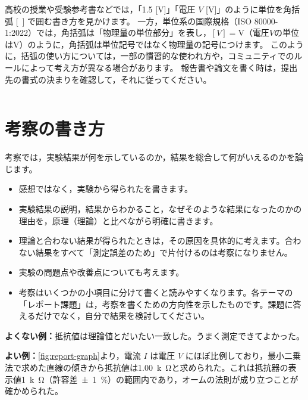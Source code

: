 \begin{column}
  高校の授業や受験参考書などでは，「1.5 [V]」「電圧 $V$ [V]」のように単位を角括弧 [~] で囲む書き方を見かけます。
  一方，単位系の国際規格（ISO 80000-1:2022）では，角括弧は「物理量の単位部分」を表し，$[V]=\mathrm{V}$（電圧$V$の単位は$\mathrm{V}$）のように，角括弧は単位記号ではなく物理量の記号につけます。
  このように，括弧の使い方については，一部の慣習的な使われ方や，コミュニティでのルールによって考え方が異なる場合があります。
  報告書や論文を書く時は，提出先の書式の決まりを確認して，それに従ってください。
\end{column}

\section{考察の書き方}

考察では，実験結果が何を示しているのか，結果を総合して何がいえるのかを論じます。
\begin{itemize}
  \item 感想ではなく，実験から得られたを書きます。
  \item 実験結果の説明，結果からわかること，なぜそのような結果になったのかの理由を，原理（理論）と比べながら明確に書きます。
  \item 理論と合わない結果が得られたときは，その原因を具体的に考えます。合わない結果をすべて「測定誤差のため」で片付けるのは考察になりません。
  \item 実験の問題点や改善点についても考えます。
  \item 考察はいくつかの小項目に分けて書くと読みやすくなります。各テーマの「レポート課題」は，考察を書くための方向性を示したものです。課題に答えるだけでなく，自分で結果を検討してください。
\end{itemize}

\begin{hosoku}[例：考察]
\textbf{よくない例：}抵抗値は理論値とだいたい一致した。うまく測定できてよかった。

\textbf{よい例：}\cref{fig:report-graph}より，電流 $I$ は電圧 $V$ にほぼ比例しており，最小二乗法で求めた直線の傾きから抵抗値は\SI{1.00}{k\ohm}と求められた。これは抵抗器の表示値\SI{1}{k\ohm}（許容差\SI{\pm1}{\percent}）の範囲内であり，オームの法則が成り立つことが確かめられた。
\end{hosoku}

